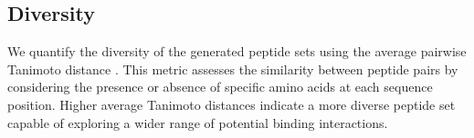 \subsection{Diversity}
We quantify the diversity of the generated peptide sets using the average pairwise Tanimoto distance \cite{bajusz2015sim, tanimoto1958elementary}. This metric assesses the similarity between peptide pairs by considering the presence or absence of specific amino acids at each sequence position. Higher average Tanimoto distances indicate a more diverse peptide set capable of exploring a wider range of potential binding interactions.
